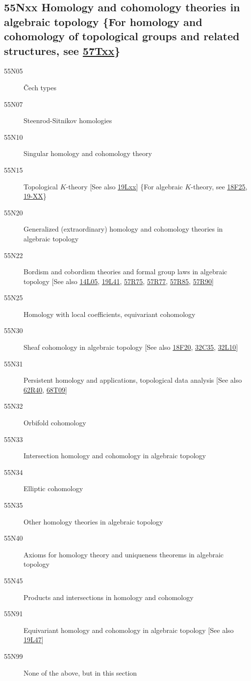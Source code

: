 \documentclass[letterpaper]{article}
\begin{document}
\subsection*{55Nxx  Homology and cohomology theories in algebraic topology \{For homology and cohomology of topological groups and related structures, see \hyperref[57Txx]{57Txx}\} }\label{55Nxx}
\begin{description}  
\item [55N05]\label{55N05} \v{C}ech types
\item [55N07]\label{55N07} Steenrod-Sitnikov homologies
\item [55N10]\label{55N10} Singular homology and cohomology theory
\item [55N15]\label{55N15} Topological $K$-theory [See also \hyperref[19Lxx]{19Lxx}] \{For algebraic $K$-theory, see \hyperref[18F25]{18F25}, \hyperref[19-XX]{19-XX}\}
\item [55N20]\label{55N20} Generalized (extraordinary) homology and cohomology theories in algebraic topology
\item [55N22]\label{55N22} Bordism and cobordism theories and formal group laws in algebraic topology [See also \hyperref[14L05]{14L05}, \hyperref[19L41]{19L41}, \hyperref[57R75]{57R75}, \hyperref[57R77]{57R77}, \hyperref[57R85]{57R85}, \hyperref[57R90]{57R90}]
\item [55N25]\label{55N25} Homology with local coefficients, equivariant cohomology
\item [55N30]\label{55N30} Sheaf cohomology in algebraic topology [See also \hyperref[18F20]{18F20}, \hyperref[32C35]{32C35}, \hyperref[32L10]{32L10}]
\item [55N31]\label{55N31} Persistent homology and applications, topological data analysis [See also \hyperref[62R40]{62R40}, \hyperref[68T09]{68T09}]
\item [55N32]\label{55N32} Orbifold cohomology
\item [55N33]\label{55N33} Intersection homology and cohomology in algebraic topology
\item [55N34]\label{55N34} Elliptic cohomology
\item [55N35]\label{55N35} Other homology theories in algebraic topology
\item [55N40]\label{55N40} Axioms for homology theory and uniqueness theorems in algebraic topology
\item [55N45]\label{55N45} Products and intersections in homology and cohomology
\item [55N91]\label{55N91} Equivariant homology and cohomology in algebraic topology [See also \hyperref[19L47]{19L47}]
\item [55N99]\label{55N99} None of the above, but in this section
\end{description}
\end{document}

